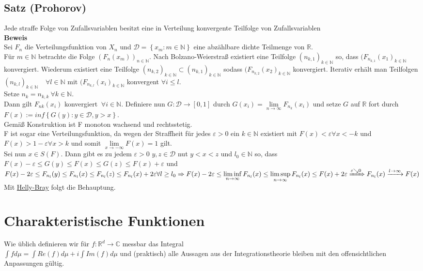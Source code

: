\documentclass[german,10pt,oneside, fleqn, a4paper]{article}
\newcommand {\R}	{\mathbb{R}}
\newcommand {\N}	{\mathbb{N}}
\newcommand {\C}	{\mathbb{C}}
\newcommand{\Ra}	{\Rightarrow}
\newcommand{\ra}{\rightarrow}
\newcommand{\lsup}[1][n]{\limsup\limits_{#1\rightarrow\infty}}
\newcommand{\linf}[1][n]{\liminf\limits_{#1\rightarrow\infty}}
\newcommand{\brac}[1]{\left\lbrace #1\right\rbrace}
\newcommand{\mc}[1]{\mathcal{#1}}
\newcommand{\beweis}{\textbf{Beweis}\\}
\newcommand{\toinf}{\rightarrow\infty}
\newcommand{\fn}[1][n]{\ \forall #1\in\N}
\newcommand{\1}[1]{1_{#1}}
\newcommand{\2}[1]{\1{\brac{#1}}}
\newcommand{\xr}[2][]{\xrightarrow[#1]{#2}}
\begin{document}
\subsection{Satz (Prohorov)}
\label{3.15}
Jede straffe Folge von Zufallsvariablen besitzt eine in Verteilung konvergente Teilfolge von Zufallsvariablen\\
\beweis
Sei $F_n$ die Verteilungsfunktion von $X_n$ und $\mc{D}=\brac{x_m:m\in\N}$ eine abzählbare dichte Teilmenge von $\R$.\\
Für $m\in\N$ betrachte die Folge $(F_n(x_m))_{n\in\N}$. Nach Bolzano-Weierstraß existiert eine Teilfolge  $(n_{k,1})_{k\in\N}$ so, dass $(F_{n_{k,1}}(x_1)_{k\in\N}$ konvergiert. Wiederum existiert eine Teilfolge $(n_{k,2})_{k\in\N}\subset(n_{k,1})_{k\in\N}$ sodass $(F_{n_{k,2}}(x_2)_{k\in\N}$ konvergiert. Iterativ erhält man Teilfolgen $(n_{k,l})_{k\in\N}$ \ $\fn[l]$ mit $(F_{n_{k,l}}(x_i)_{k\in\N}$ konvergent $\forall i\leq l$.\\
Setze $n_k=n_{k,k}\ \forall k\in\N$.\\
Dann gilt $F_{nk}(x_i)$ konvergiert $\fn[i]$. Definiere nun $G:\mc{D}\ra[0,1]$ durch $G(x_i)=\lim\limits_{n\toinf}F_{n_k}(x_i)$ und setze $G$ auf $\R$ fort durch $F(x):=inf\brac{G(y):y\in\mc{D},y>x}$.\\
Gemäß Konstruktion ist F monoton wachsend und rechtsstetig.\\
F ist sogar eine Verteilungsfunktion, da wegen der Straffheit für jedes $\varepsilon>0$ ein $k\in\N$ existiert mit $F(x)<\varepsilon\forall x<-k$ und $F(x)>1-\varepsilon \forall x>k$ und somit $\lim\limits_{x\ra -\infty}F(x)=1$ gilt.\\
Sei nun $x\in S(F)$. Dann gibt es zu jedem $\varepsilon>0$ $y,z\in\mc{D}$ nut $y<x<z$ und $l_0\in\N$ so, dass \\
$F(x)-\varepsilon\leq G(y)\leq F(x)\leq G(z)\leq F(x)+\varepsilon$ und\\
$F(x)-2\varepsilon\leq F_{n_l}(y)\leq F_{n_l}(x)\leq F_{n_l}(z)\leq F_{n_l}(x)+2\varepsilon \forall l\geq l_0\\
\Ra F(x)-2\varepsilon\leq\linf F_{n_l}(x)\leq \lsup F_{n_l}(x)\leq F(x)+2\varepsilon\\
\xRightarrow{\varepsilon\searrow0}F_{n_l}(x)\xr{l\toinf}F(x)$\\
Mit \hyperref[3.8]{Helly-Bray} folgt die Behauptung.







\pagebreak
\section{Charakteristische Funktionen}
Wie üblich definieren wir für $f:\R^d\ra\C$ messbar das Integral \\
$\int fd\mu=\int Re(f)d\mu+i\int Im(f)d\mu$ und (praktisch) alle Aussagen aus der Integrationstheorie bleiben mit den offensichtlichen Anpassungen gültig.
\end{document}

